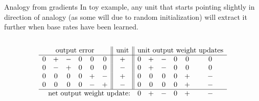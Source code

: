 \documentclass{beamer}
\begin{document}
\begin{frame}[allowframebreaks]


\end{frame}

\appendix
\begin{frame}{Analogy from gradients}
In toy example, any unit that starts pointing slightly in direction of analogy (as some will due to random initialization) will extract it further when base rates have been learned.\\[11pt]
\begin{columns}
\end{columns} 
{ 
\[
\begin{array}{cccccc||c||cccccc} 
\multicolumn{6}{c||}{\text{output error}}  & \text{unit}  & \multicolumn{6}{c}{\text{unit output weight updates}} \\
\hline
 0 & + & - & 0 & 0 & 0  &   +    &  0 & + & - & 0 & 0 & 0   \\
0 & - & + & 0 & 0 & 0  &   -  & 0 & + & - & 0 & 0 & 0   \\
 0 & 0 & 0 & 0 & + & - &   +   &  0 & 0 & 0 & 0 & + & - \\
 0 & 0 & 0 & 0 & - & +  &  - &  0 & 0 & 0 & 0 & + & - \\
\hline
\multicolumn{7}{r}{\text{net output weight update:}} &   0 & + & - & 0 & + & - \\
\end{array} 
\]
}
\end{frame}
\end{document}

